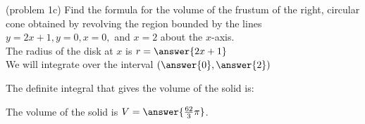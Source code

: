 \documentclass[handout]{ximera}
\begin{document}
\begin{problem}(problem 1c)
Find the formula for the volume of the frustum of the right, circular cone obtained by revolving the region bounded by the lines
$y = 2x+1, y=0, x = 0,$ and $x = 2$ about the $x$-axis.\\


The radius of the disk at $x$ is $r = \answer{2x+1}$\\
We will integrate over the interval $\left(\answer{0},\answer{2}\right)$

The definite integral that gives the volume of the solid is:\\
\begin{multipleChoice}
\end{multipleChoice}

The volume of the solid is $V = \answer{\frac{62}{3} \pi }$.


\end{problem}
\end{document}
